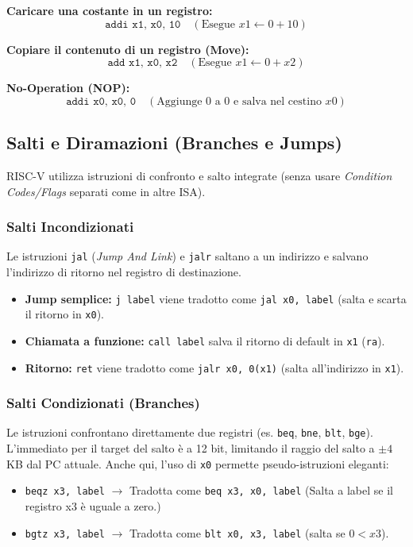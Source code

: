 \begin{example}
\textbf{Caricare una costante in un registro:}
\[ \texttt{addi x1, x0, 10} \quad (\text{Esegue } x1 \leftarrow 0 + 10) \]

\textbf{Copiare il contenuto di un registro (Move):}
\[ \texttt{add x1, x0, x2} \quad (\text{Esegue } x1 \leftarrow 0 + x2) \]

\textbf{No-Operation (NOP):}
\[ \texttt{addi x0, x0, 0} \quad (\text{Aggiunge 0 a 0 e salva nel cestino } x0) \]
\end{example}

\subsection{Salti e Diramazioni (Branches e Jumps)}
RISC-V utilizza istruzioni di confronto e salto integrate (senza usare \textit{Condition Codes/Flags} separati come in altre ISA).

\subsubsection{Salti Incondizionati}
Le istruzioni \texttt{jal} (\textit{Jump And Link}) e \texttt{jalr} saltano a un indirizzo e salvano l'indirizzo di ritorno nel registro di destinazione.
\begin{itemize}
    \item \textbf{Jump semplice:} \texttt{j label} viene tradotto come \texttt{jal x0, label} (salta e scarta il ritorno in \texttt{x0}).
    \item \textbf{Chiamata a funzione:} \texttt{call label} salva il ritorno di default in \texttt{x1} (\texttt{ra}).
    \item \textbf{Ritorno:} \texttt{ret} viene tradotto come \texttt{jalr x0, 0(x1)} (salta all'indirizzo in \texttt{x1}).
\end{itemize}

\subsubsection{Salti Condizionati (Branches)}
Le istruzioni confrontano direttamente due registri (es. \texttt{beq}, \texttt{bne}, \texttt{blt}, \texttt{bge}). L'immediato per il target del salto è a 12 bit, limitando il raggio del salto a \(\pm 4\) KB dal PC attuale.
Anche qui, l'uso di \texttt{x0} permette pseudo-istruzioni eleganti:
\begin{itemize}
    \item \texttt{beqz x3, label} $\rightarrow$ Tradotta come \texttt{beq x3, x0, label} (Salta a label se il registro x3 è uguale a zero.)
    \item \texttt{bgtz x3, label} $\rightarrow$ Tradotta come \texttt{blt x0, x3, label} (salta se \(0 < x3\)).
\end{itemize}

